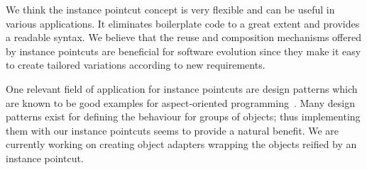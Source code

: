 \documentclass[10pt]{sigplanconf}
\begin{document}
We think the instance pointcut concept is very flexible and can be useful in various applications.
It eliminates boilerplate code to a great extent and provides a readable syntax.
We believe that the reuse and composition mechanisms offered by instance pointcuts are beneficial for software evolution since they make it easy to create tailored variations according to new requirements.



One relevant field of application for instance pointcuts are design patterns which are known to be good examples for aspect-oriented programming~\cite{hannemann:oopsla02}.
Many design patterns exist for defining the behaviour for groups of objects; thus implementing them with our instance pointcuts seems to provide a natural benefit.
We are currently working on creating object adapters wrapping the objects reified by an instance pointcut.




\end{document}
